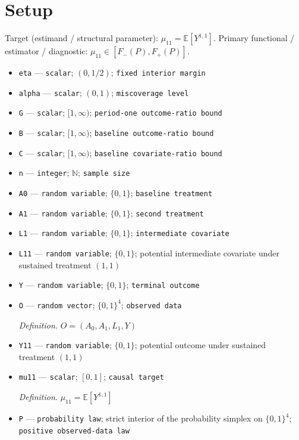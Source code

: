 \documentclass{article}
\begin{document}
\section{Setup}

Target (estimand / structural parameter): \(\mu_{11}=\mathbb E[Y^{1,1}]\).
Primary functional / estimator / diagnostic: \(\mu_{11}\in[F_-(P),F_+(P)]\).
\begin{itemize}
  \item \texttt{eta} --- \texttt{scalar}; \((0,1/2)\); \texttt{fixed interior margin}
  \item \texttt{alpha} --- \texttt{scalar}; \((0,1)\); \texttt{miscoverage level}
  \item \texttt{G} --- \texttt{scalar}; \([1,\infty)\); \texttt{period-\allowbreak{}one outcome-\allowbreak{}ratio bound}
  \item \texttt{B} --- \texttt{scalar}; \([1,\infty)\); \texttt{baseline outcome-\allowbreak{}ratio bound}
  \item \texttt{C} --- \texttt{scalar}; \([1,\infty)\); \texttt{baseline covariate-\allowbreak{}ratio bound}
  \item \texttt{n} --- \texttt{integer}; \(\mathbb N\); \texttt{sample size}
  \item \texttt{A0} --- \texttt{random variable}; \(\{0,1\}\); \texttt{baseline treatment}
  \item \texttt{A1} --- \texttt{random variable}; \(\{0,1\}\); \texttt{second treatment}
  \item \texttt{L1} --- \texttt{random variable}; \(\{0,1\}\); \texttt{intermediate covariate}
  \item \texttt{L11} --- \texttt{random variable}; \(\{0,1\}\); potential intermediate covariate under sustained treatment \((1,1)\)
  \item \texttt{Y} --- \texttt{random variable}; \(\{0,1\}\); \texttt{terminal outcome}
  \item \texttt{O} --- \texttt{random vector}; \(\{0,1\}^4\); \texttt{observed data}
  \par\smallskip\noindent\emph{Definition.} \(O=(A_0,A_1,L_1,Y)\)
  \item \texttt{Y11} --- \texttt{random variable}; \(\{0,1\}\); potential outcome under sustained treatment \((1,1)\)
  \item \texttt{mu11} --- \texttt{scalar}; \([0,1]\); \texttt{causal target}
  \par\smallskip\noindent\emph{Definition.} \(\mu_{11}=\mathbb E[Y^{1,1}]\)
  \item \texttt{P} --- \texttt{probability law}; strict interior of the probability simplex on \(\{0,1\}^4\); \texttt{positive observed-\allowbreak{}data law}

\end{itemize}
\end{document}
